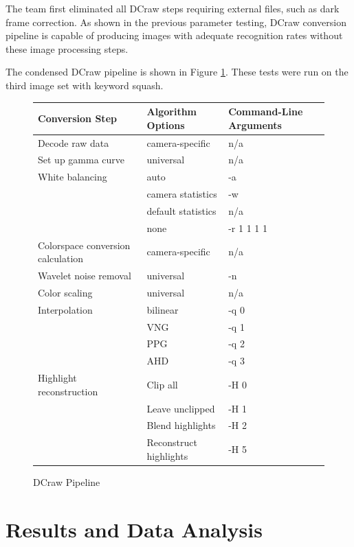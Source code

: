 \documentclass{report}
\begin{document}
		
		The team first eliminated all DCraw steps requiring external files, such as dark frame correction. As shown in the previous parameter testing, DCraw conversion pipeline is capable of producing images with adequate recognition rates without these image processing steps. 
		
		The condensed DCraw pipeline is shown in Figure \ref{condenseddcraw}. These tests were run on the third image set with keyword squash.
		
		\begin{figure}
			\begin{center}
				\label{condenseddcraw}
				\caption{DCraw Pipeline}
				\begin{tabular}{lll}
					Conversion Step & Algorithm Options & Command-Line Arguments\\
					\hline
					Decode raw data & camera-specific & n/a\\
					Set up gamma curve & universal & n/a\\
					White balancing & auto & -a\\
					& camera statistics & -w\\
					& default statistics & n/a \\
					& none & -r 1 1 1 1 \\
					Colorspace conversion calculation & camera-specific & n/a\\
					Wavelet noise removal & universal & -n \\
					Color scaling & universal & n/a \\
					Interpolation & bilinear & -q 0 \\
					& VNG & -q 1 \\
					& PPG & -q 2 \\
					& AHD & -q 3 \\
					Highlight reconstruction & Clip all & -H 0 \\
					& Leave unclipped & -H 1 \\
					& Blend highlights & -H 2 \\
					& Reconstruct highlights & -H 5 \\
				\end{tabular}
					
			\end{center}
		\end{figure}
		
	\section{Results and Data Analysis}
\end{document}

